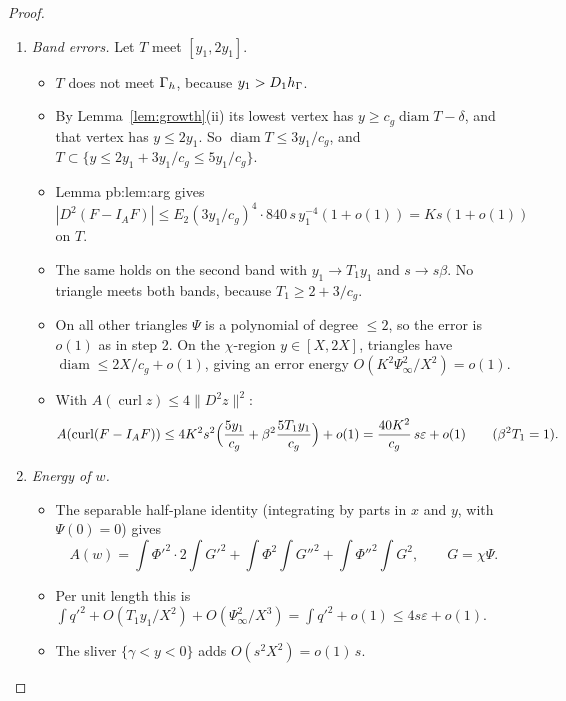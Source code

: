 \documentclass[11pt]{article}
\theoremstyle{remark}\newtheorem{remark}[theorem]{Remark}
\newcommand{\norm}[1]{\|#1\|}\newcommand{\ip}[2]{\langle #1,#2\rangle}\DeclareMathOperator{\curl}{curl}\DeclareMathOperator{\diam}{diam}
\begin{document}
\begin{proof}
\begin{enumerate}[label=\arabic*.]
\begin{itemize}
    $o(1)\,s\,\hG^{1-j}$ for $j=1,2$.
  \item Hence $B(v)=B_{\Gh}(w)+o(1)s$ and $C(v)=C_{\Gh}(w)(1+o(1))$ with $w=\curl F$.
  \item As in step 2 of Theorem pb:thmA, using $n\,ds=(\gamma',-1)dx$, $q(\gamma)=1+O(s\delta)$ and $\Psi(\gamma)=O(\delta)$,
    one gets $B_{\Gh}(w)=s(1+O(s\delta)+O(\sigma/(sX)))$ and $C_{\Gh}(w)=1+O(s\delta+\sigma^2)$.
  \item Since $s\delta\sim\varepsilon X^2/\hG$ and $\sigma/(sX)\sim\hG/\varepsilon$, both are $o(1)$ as $\hG\to0$.
  \end{itemize}
\item \emph{Band errors.} Let $T$ meet $[y_1,2y_1]$.
  \begin{itemize}
  \item $T$ does not meet $\Gamma_h$, because $y_1>D_1h_\Gamma$.
  \item By Lemma~\ref{lem:growth}(ii) its lowest vertex has $y\ge c_g\diam T-\delta$, and that vertex has $y\le2y_1$. So
    $\diam T\le3y_1/c_g$, and $T\subset\{y\le2y_1+3y_1/c_g\le5y_1/c_g\}$.
  \item Lemma pb:lem:arg gives $|D^2(F-I_AF)|\le E_2(3y_1/c_g)^4\cdot840\,s\,y_1^{-4}(1+o(1))=Ks(1+o(1))$ on $T$.
  \item The same holds on the second band with $y_1\to T_1y_1$ and $s\to s\beta$. No triangle meets both bands, because
    $T_1\ge2+3/c_g$.
  \item On all other triangles $\Psi$ is a polynomial of degree $\le2$, so the error is $o(1)$ as in step 2. On the
    $\chi$-region $y\in[X,2X]$, triangles have $\diam\le 2X/c_g+o(1)$, giving an error energy $O(K^2\Psi_\infty^2/X^2)=o(1)$.
  \item With $A(\curl z)\le4\norm{D^2z}^2$:
\[A(\curl(F-I_AF))\le4K^2s^2\Bigl(\frac{5y_1}{c_g}+\beta^2\frac{5T_1y_1}{c_g}\Bigr)+o(1)=\frac{40K^2}{c_g}\,s\varepsilon+o(1)\qquad(\beta^2T_1=1).\]
  \end{itemize}
\item \emph{Energy of $w$.}
  \begin{itemize}
  \item The separable half-plane identity (integrating by parts in $x$ and $y$, with $\Psi(0)=0$) gives
\[A(w)=\int\Phi'^2\!\cdot\!2\!\int G'^2+\int\Phi^2\!\int G''^2+\int\Phi''^2\!\int G^2,\qquad G=\chi\Psi .\]
  \item Per unit length this is $\int q'^2+O(T_1y_1/X^2)+O(\Psi_\infty^2/X^3)=\int q'^2+o(1)\le4s\varepsilon+o(1)$.
  \item The sliver $\{\gamma<y<0\}$ adds $O(s^2X^2)=o(1)\,s$.

\end{itemize}
\end{enumerate}
\end{proof}
\end{document}
